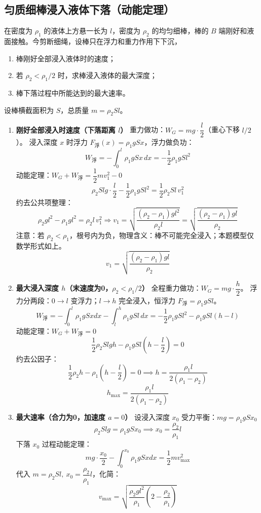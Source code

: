 \subsection{匀质细棒浸入液体下落（动能定理）}
在密度为 $\rho_1$ 的液体上方悬一长为 $l$，密度为 $\rho_2$ 的均匀细棒，棒的 $B$ 端刚好和液面接触。今剪断细绳，设棒只在浮力和重力作用下下沉，
\begin{enumerate}
  \item 棒刚好全部浸入液体时的速度；
  \item 若 $\rho_2<\rho_1/2$ 时，求棒浸入液体的最大深度；
  \item 棒下落过程中所能达到的最大速率。
\end{enumerate}
\begin{solution}
设棒横截面积为 $S$，总质量 $m=\rho_2 S l$。
\begin{enumerate}
\item \textbf{刚好全部浸入时速度（下落距离 $l$）}
重力做功：$W_G = mg \cdot \dfrac{l}{2}$（重心下移 $l/2$）。
浸入深度 $x$ 时浮力 $F_\text{浮}(x)=\rho_1 g S x$，浮力做负功：
\[
W_\text{浮} = -\int_{0}^{l} \rho_1 g S x \,dx = -\frac12 \rho_1 g S l^2
\]
动能定理：$W_G + W_\text{浮} = \dfrac12 m v_1^2 - 0$
\[
\rho_2 S l g \cdot \frac{l}{2} - \frac12 \rho_1 g S l^2
= \frac12 \rho_2 S l \,v_1^2
\]
约去公共项整理：
\[
\rho_2 g l^2 - \rho_1 g l^2 = \rho_2 l\, v_1^2
\Rightarrow
v_1=\sqrt{\frac{(\rho_2-\rho_1)gl^2}{\rho_2 l}}
=\sqrt{\frac{(\rho_2-\rho_1)gl}{\rho_2}}
\]
注意：若 $\rho_2<\rho_1$，根号内为负，物理含义：棒不可能完全浸入；本题模型仅数学形式如上。
\[
\boxed{v_1 = \sqrt{\frac{(\rho_2-\rho_1)gl}{\rho_2}}}
\]
\item \textbf{最大浸入深度 $h$（末速度为0，$\rho_2<\rho_1/2$）}
全程重力做功：$W_G = mg \cdot \dfrac{h}{2}$。
浮力分两段：$0\to l$ 变浮力；$l\to h$ 完全浸入，恒浮力 $F_\text{浮}=\rho_1 g S l$。
\[
W_\text{浮} = -\int_{0}^{l}\rho_1 g S x dx - \int_{l}^{h}\rho_1 g S l \,dx
= -\frac12 \rho_1 g S l^2 - \rho_1 g S l (h-l)
\]
动能定理：$W_G + W_\text{浮}=0$
\[
\frac12 \rho_2 S l g h - \rho_1 g S l \left(h-\frac{l}{2}\right)=0
\]
约去公因子：
\[
\frac12 \rho_2 h - \rho_1\left(h-\frac{l}{2}\right)=0
\implies h = \frac{\rho_1 l}{2(\rho_1-\rho_2)}
\]
\[
\boxed{h_\text{max} = \frac{\rho_1 l}{2(\rho_1-\rho_2)}}
\]
\item \textbf{最大速率（合力为0，加速度 $a=0$）}
设浸入深度 $x_0$ 受力平衡：$mg = \rho_1 g S x_0$
\[
\rho_2 S l g = \rho_1 g S x_0 \implies x_0 = \frac{\rho_2}{\rho_1}l
\]
下落 $x_0$ 过程动能定理：
\[
mg\cdot \frac{x_0}{2} - \int_{0}^{x_0}\rho_1 g S x dx = \frac12 m v_\text{max}^2
\]
代入 $m=\rho_2 S l,\ x_0=\dfrac{\rho_2}{\rho_1}l$，化简：
\[
\boxed{v_\text{max} = \sqrt{\frac{\rho_2 g l^2}{\rho_1}\left(2-\frac{\rho_2}{\rho_1}\right)}}
\]
\end{enumerate}
\end{solution}
